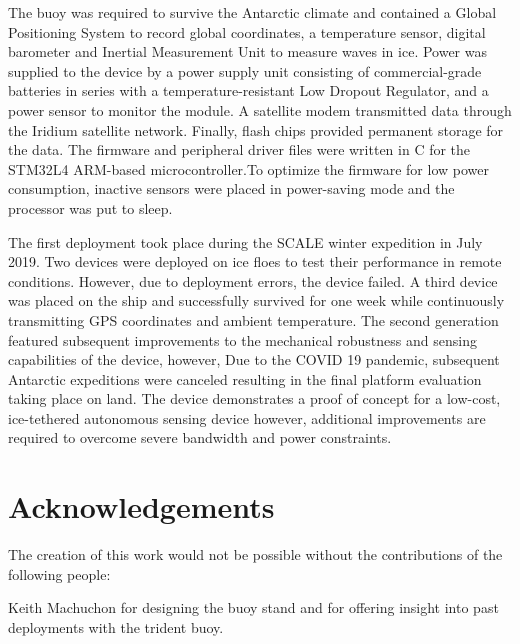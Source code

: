 \documentclass[a4paper, 12pt, oneside, openright, parskip=full]{book}
\begin{document}
The buoy was required to survive the Antarctic climate and contained a Global Positioning System to record global coordinates, a temperature sensor, digital barometer and Inertial Measurement Unit to measure waves in ice. Power was supplied to the device by a power supply unit consisting of commercial-grade batteries in series with a temperature-resistant Low Dropout Regulator, and a power sensor to monitor the module. A satellite modem transmitted data through the Iridium satellite network. Finally, flash chips provided permanent storage for the data. The firmware and peripheral driver files were written in C for the STM32L4 ARM-based microcontroller.To optimize the firmware for low power consumption, inactive sensors were placed in power-saving mode and the processor was put to sleep. \par 

The first deployment took place during the SCALE winter expedition in July 2019. Two devices were deployed on ice floes to test their performance in remote conditions. However, due to deployment errors, the device failed. A third device was placed on the ship and successfully survived for one week while continuously transmitting GPS coordinates and ambient temperature. The second generation featured subsequent improvements to the mechanical robustness and sensing capabilities of the device, however, Due to the COVID 19 pandemic, subsequent Antarctic expeditions were canceled resulting in the final platform evaluation taking place on land. The device demonstrates a proof of concept for a low-cost, ice-tethered autonomous sensing device however, additional improvements are required to overcome severe bandwidth and power constraints.
\chapter{Acknowledgements}		
\label{ch:ack}


The creation of  this work would not be possible without the contributions of the following people:

Keith Machuchon for designing the buoy stand and for offering insight into past deployments with the trident buoy.
\end{document}
